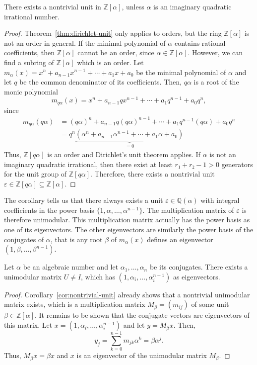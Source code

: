 \begin{corollary}
  \label{cor:nontrivial-unit}
  There exists a nontrivial unit in $ℤ[α]$,
  unless $α$ is an imaginary quadratic irrational number.
\end{corollary}

\begin{proof}
  Theorem~\ref{thm:dirichlet-unit} only applies to orders,
  but the ring $ℤ[α]$ is not an order in general.
  If the minimal polynomial of $α$ contains rational coefficients,
  then $ℤ[α]$ cannot be an order, since $α ∈ ℤ[α]$.
  However, we can find a subring of $ℤ[α]$ which is an order.
  Let $m_α(x) = x^n + a_{n-1} x^{n-1} + ⋯ + a_1 x + a_0$ be the minimal polynomial of $α$
  and let $q$ be the common denominator of its coefficients.
  Then, $q α$ is a root of the monic polynomial
  \[
    m_{qα}(x) = x^n + a_{n-1} q x^{n-1} + ⋯ + a_1 q^{n-1} + a_0 q^n,
  \]
  since
  \begin{align*}
    m_{qα}(qα)
    & = (qα)^n + a_{n-1} q (qα)^{n-1} + ⋯ + a_1 q^{n-1} (q α) + a_0 q^n \\
    & = q^n \underbrace{(α^n + a_{n-1} α^{n-1} + ⋯ + a_1 α + a_0)}_{= 0}
  \end{align*}
  Thus, $ℤ[qα]$ is an order and Dirichlet's unit theorem applies.
  If $α$ is not an imaginary quadratic irrational, then there exist at least $r₁ + r₂ - 1 > 0$
  generators for the unit group of $ℤ[qα]$.
  Therefore, there exists a nontrivial unit $ε ∈ ℤ[qα] ⊆ ℤ[α]$.
\end{proof}

The corollary tells us that there always exists a unit $ε ∈ ℚ(α)$ with integral
coefficients in the power basis $\{1, α, …, α^{n-1}\}$.
The multiplication matrix of $ε$ is therefore unimodular.
This multiplication matrix actually has the power basis as one of its eigenvectors.
The other eigenvectors are similarly the power basis of the conjugates of $α$,
that is any root $β$ of $m_α(x)$ defines an eigenvector $(1, β, …, β^{n-1})$.

\begin{theorem}
  \label{thm:unimodular-algebraic}
  Let $α$ be an algebraic number and let $α_1, …, α_n$ be its conjugates.
  There exists a unimodular matrix $U ≠ I$,
  which has $(1, α_i, …, α_i^{n-1})$ as eigenvectors.
\end{theorem}

\begin{proof}
  Corollary~\ref{cor:nontrivial-unit}
  already shows that a nontrivial unimodular matrix exists,
  which is a multiplication matrix $M_β = (m_{ij})$ of some unit $β ∈ ℤ[α]$.
  It remains to be shown that the conjugate vectors are eigenvectors of this matrix.
  Let $x = (1, α_i, …, α_i^{n-1})$ and let $y = M_β x$.
  Then,
  \[
    y_j = \sum_{k=0}^{n-1} m_{jk} α^k = β α^j.
  \]
  Thus, $M_β x = β x$ and $x$ is an eigenvector of the unimodular matrix $M_β$.
\end{proof}

